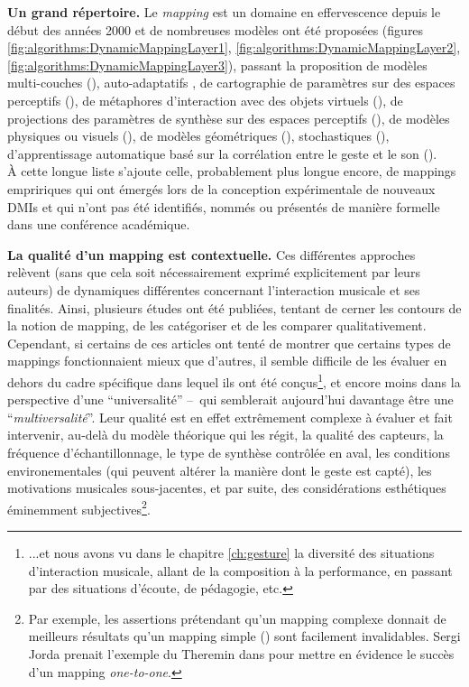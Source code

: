 \par{\textbf{Un grand répertoire.}} Le \textit{mapping} est un domaine en effervescence depuis le début des années 2000 et de nombreuses modèles ont été proposées (figures \ref{fig:algorithms:DynamicMappingLayer1}, \ref{fig:algorithms:DynamicMappingLayer2}, \ref{fig:algorithms:DynamicMappingLayer3}), passant la proposition de modèles multi-couches (\cite{wanderley_escher-modeling_1998, hunt_mapping_2002}), auto-adaptatifs \cite{verfaille_mapping_2006}, de cartographie de paramètres sur des espaces perceptifs (\cite{wessel_timbre_1979, schwarz_sound_2012, tubb_divergent_2014}), de métaphores d'interaction avec des objets virtuels (\cite{wessel_intimate_2002}), de projections des paramètres de synthèse sur des espaces perceptifs (\cite{wyse_instrumentalizing_2010}), de modèles physiques ou visuels (\cite{momeni_dynamic_2006}), de modèles géométriques (\cite{van_nort_choice_2004}), stochastiques (\cite{dabby_musical_1996}), d'apprentissage automatique basé sur la corrélation entre le geste et le son (\cite{fiebrink_real-time_2011, caramiaux_mapping_2014, francoise_motion-sound_2015}).\\
\indent À cette longue liste s'ajoute celle, probablement plus longue encore, de mappings empririques qui ont émergés lors de la conception expérimentale de nouveaux \glspl{DMI} et qui n'ont pas été identifiés, nommés ou présentés de manière formelle dans une conférence académique.

\par{\textbf{La qualité d'un mapping est contextuelle.}} Ces différentes approches relèvent (sans que cela soit nécessairement exprimé explicitement par leurs auteurs) de dynamiques différentes concernant l'interaction musicale et ses finalités. Ainsi, plusieurs études ont été publiées, tentant de cerner les contours de la notion de mapping, de les catégoriser et de les comparer qualitativement. Cependant, si certains de ces articles ont tenté de montrer que certains types de mappings fonctionnaient mieux que d'autres, il semble difficile de les évaluer en dehors du cadre spécifique dans lequel ils ont été conçus\footnote{...et nous avons vu dans le chapitre \ref{ch:gesture} la diversité des situations d'interaction musicale, allant de la composition à la performance, en passant par des situations d'écoute, de pédagogie, etc.}, et encore moins dans la perspective d'une ``universalité'' --~qui semblerait aujourd'hui davantage être une ``\textit{multiversalité}''. Leur qualité est en effet extrêmement complexe à évaluer et fait intervenir, au-delà du modèle théorique qui les régit, la qualité des capteurs, la fréquence d'échantillonnage, le type de synthèse contrôlée en aval, les conditions environementales (qui peuvent altérer la manière dont le geste est capté), les motivations musicales sous-jacentes, et par suite, des considérations esthétiques éminemment subjectives\footnote{Par exemple, les assertions prétendant qu'un mapping complexe donnait de meilleurs résultats qu'un mapping simple (\cite{rovan_instrumental_1997, hunt_mapping_2000}) sont facilement invalidables. Sergi Jorda prenait l'exemple du Theremin dans \cite{jorda_digital_2005} pour mettre en évidence le succès d'un mapping \textit{one-to-one}.}.

